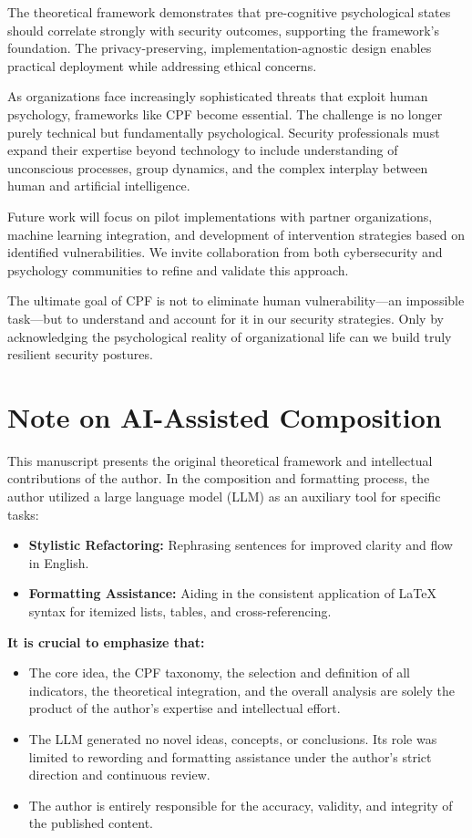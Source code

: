 \documentclass[11pt,a4paper]{article}
\begin{document}
The theoretical framework demonstrates that pre-cognitive psychological states should correlate strongly with security outcomes, supporting the framework's foundation. The privacy-preserving, implementation-agnostic design enables practical deployment while addressing ethical concerns.

As organizations face increasingly sophisticated threats that exploit human psychology, frameworks like CPF become essential. The challenge is no longer purely technical but fundamentally psychological. Security professionals must expand their expertise beyond technology to include understanding of unconscious processes, group dynamics, and the complex interplay between human and artificial intelligence.

Future work will focus on pilot implementations with partner organizations, machine learning integration, and development of intervention strategies based on identified vulnerabilities. We invite collaboration from both cybersecurity and psychology communities to refine and validate this approach.

The ultimate goal of CPF is not to eliminate human vulnerability---an impossible task---but to understand and account for it in our security strategies. Only by acknowledging the psychological reality of organizational life can we build truly resilient security postures.

\section*{Note on AI-Assisted Composition}
\label{sec:ai_declaration}

This manuscript presents the original theoretical framework and intellectual contributions of the author. In the composition and formatting process, the author utilized a large language model (LLM) as an auxiliary tool for specific tasks:

\begin{itemize}
    \item \textbf{Stylistic Refactoring:} Rephrasing sentences for improved clarity and flow in English.
    \item \textbf{Formatting Assistance:} Aiding in the consistent application of LaTeX syntax for itemized lists, tables, and cross-referencing.
\end{itemize}

\noindent \textbf{It is crucial to emphasize that:}
\begin{itemize}
    \item The core idea, the CPF taxonomy, the selection and definition of all indicators, the theoretical integration, and the overall analysis are solely the product of the author's expertise and intellectual effort.
    \item The LLM generated no novel ideas, concepts, or conclusions. Its role was limited to rewording and formatting assistance under the author's strict direction and continuous review.
    \item The author is entirely responsible for the accuracy, validity, and integrity of the published content.
\end{itemize}
\end{document}
